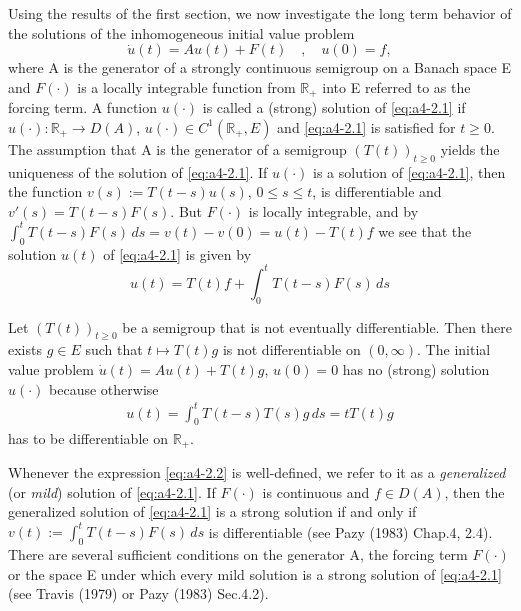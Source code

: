 Using the results of the first section, we now investigate the long
term behavior of the solutions of the inhomogeneous initial value
problem
\begin{equation}\label{eq:a4-2.1}
\dot{u}(t) = Au(t) + F(t) \quad , \quad u(0) = f,
\end{equation}
where A is the generator of a strongly continuous semigroup on a
Banach space E and $F(\cdot)$ is a locally integrable function from $\mathbb{R}_{+}$
into E referred to as the forcing term. 
A function $u(\cdot)$ is called a (strong)
solution of \eqref{eq:a4-2.1} if $u(\cdot) \colon \mathbb{R}_{+} \to D(A)$, $u(\cdot) \in C^{1}(\mathbb{R}_{+},E)$ and \eqref{eq:a4-2.1} is satisfied for $t \geq 0$.
The assumption that A is the generator of a semigroup $(T(t))_{t \geq 0}$
yields the uniqueness of the solution of \eqref{eq:a4-2.1}. 
If $u(\cdot)$ is a solution of \eqref{eq:a4-2.1}, then the function $v(s) := T(t-s)u(s)$, $0 \leq s \leq t$, is
differentiable and $v'(s) = T(t-s)F(s)$. 
But $F(\cdot)$ is locally integrable, and by $\int_{0}^{t} T(t-s)F(s) \, ds = v(t) - v(0) = u(t) - T(t)f$ we see
that the solution $u(t)$ of \eqref{eq:a4-2.1} is given by
\begin{equation}\label{eq:a4-2.2}
u(t) = T(t)f + \int_{0}^{t} T(t-s)F(s) \, ds
\end{equation}

\bigskip
{} \label{ex:a4-2.1}
Let $(T(t))_{t \geq 0}$ be a semigroup that is not eventually differentiable. 
Then there
exists $g \in E$ such that $t \mapsto T(t)g$ is not differentiable on $(0,\infty)$.
The initial value problem $\dot{u}(t) = Au(t) + T(t)g$, $u(0) = 0$ has no
(strong) solution $u(\cdot)$ because otherwise
\begin{align*}
u(t) = \int_{0}^{t} T(t-s)T(s)g \, ds = tT(t)g
\end{align*}
has to be differentiable on $\mathbb{R}_{+}$.

\bigskip
\noindent
Whenever the expression \eqref{eq:a4-2.2} is well-defined, we refer to it as a  \emph{generalized} (or
\emph{mild}) solution of \eqref{eq:a4-2.1}. 
If $F(\cdot)$ is continuous and $f \in D(A)$, then
the generalized solution of \eqref{eq:a4-2.1} is a strong solution if and only if
$v(t) := \int_{0}^{t} T(t-s)F(s) \, ds$ is differentiable (see Pazy (1983) Chap.4,
2.4). 
There are several sufficient conditions on the generator A,
the forcing term $F(\cdot)$ or the space E under which every mild solution
is a strong solution of \eqref{eq:a4-2.1} (see Travis (1979) or Pazy (1983)
Sec.4.2).

